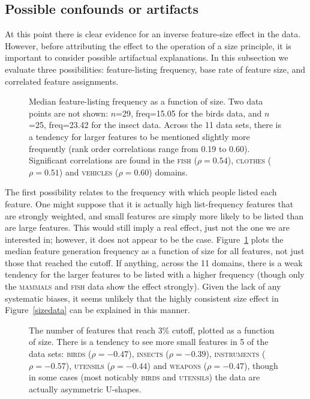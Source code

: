 \documentclass{apa}
\newcommand{\domain}[1]{\textsc{#1}}
\begin{document}
\subsection{Possible confounds or artifacts}

At this point there is clear evidence for an inverse feature-size effect in the data. However, before attributing the effect to the operation of a size principle, it is important to consider possible artifactual explanations. In this subsection we evaluate three possibilities: feature-listing frequency, base rate of feature size, and correlated feature assignments.

\begin{figure}
\begin{center}
\caption{Median feature-listing frequency as a function of size. Two data points are not shown: $n$=29, freq=15.05 for the birds data, and $n$=25, freq=23.42 for the insect data. Across the 11 data sets, there is a tendency for larger features to be mentioned slightly more frequently (rank order correlations range from 0.19 to 0.60). Significant correlations are found in the \domain{fish} ($\rho=0.54$), \domain{clothes} ($\rho=0.51$) and \domain{vehicles} ($\rho=0.60$) domains.}
\label{sizegen}
\end{center}
\end{figure}

The first possibility relates to the frequency with which people listed each feature. One might suppose that it is actually high list-frequency features that are strongly weighted, and small features are simply more likely to be listed than are large features. This would still imply a real effect, just not the one we are interested in; however, it does not appear to be the case. Figure~\ref{sizegen}  plots the median feature generation frequency as a function of size for all features, not just those that reached the cutoff. If anything, across the 11 domains, there is a weak tendency for the larger features to be listed with a higher frequency (though only the \domain{mammals} and \domain{fish} data show the effect strongly). Given the lack of any systematic biases, it seems unlikely that the highly consistent size effect in Figure~\ref{sizedata} can be explained in this manner.



\begin{figure}
\begin{center}
\caption{The number of features that reach 3\% cutoff, plotted as a function of size. There is a tendency to see more small features in 5 of the data sets: \domain{birds} ($\rho=-0.47$), \domain{insects} ($\rho=-0.39$), \domain{instruments} ($\rho =-0.57$), \domain{utensils} ($\rho=-0.44$) and \domain{weapons} ($\rho=-0.47$), though in some cases (most noticably \domain{birds} and \domain{utensils}) the data are actually asymmetric U-shapes.}
\label{sizeskept}
\end{center}
\end{figure}
\end{document}
